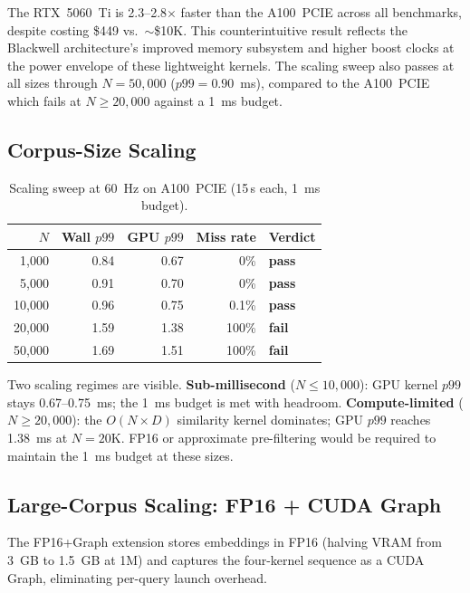 \documentclass[11pt]{article}
\begin{document}
The RTX~5060~Ti is 2.3--2.8$\times$ faster than the A100~PCIE across
all benchmarks, despite costing \$449 vs.\ $\sim$\$10K. This
counterintuitive result reflects the Blackwell architecture's improved
memory subsystem and higher boost clocks at the power envelope of these
lightweight kernels. The scaling sweep also passes at all sizes through
$N{=}50{,}000$ ($p99 = 0.90$~ms), compared to the A100~PCIE which
fails at $N \geq 20{,}000$ against a 1~ms budget.

\subsection{Corpus-Size Scaling}

\begin{table}[ht]
\centering
\small
\caption{Scaling sweep at 60~Hz on A100~PCIE (15\,s each, 1~ms budget).}
\label{tab:scaling}
\begin{tabular}{rrrrl}
\toprule
\textbf{$N$} & \textbf{Wall $p99$} & \textbf{GPU $p99$} & \textbf{Miss rate} & \textbf{Verdict} \\
\midrule
 1{,}000 & 0.84 & 0.67 &    0\% & \textbf{pass} \\
 5{,}000 & 0.91 & 0.70 &    0\% & \textbf{pass} \\
10{,}000 & 0.96 & 0.75 &  0.1\% & \textbf{pass} \\
20{,}000 & 1.59 & 1.38 &  100\% & \textbf{fail} \\
50{,}000 & 1.69 & 1.51 &  100\% & \textbf{fail} \\
\bottomrule
\end{tabular}
\end{table}

Two scaling regimes are visible. \textbf{Sub-millisecond}
($N \leq 10{,}000$): GPU kernel $p99$ stays 0.67--0.75~ms; the 1~ms
budget is met with headroom. \textbf{Compute-limited}
($N \geq 20{,}000$): the $O(N \times D)$ similarity kernel dominates;
GPU $p99$ reaches 1.38~ms at $N{=}20$K. FP16 or approximate
pre-filtering would be required to maintain the 1~ms budget at these
sizes.

\subsection{Large-Corpus Scaling: FP16 + CUDA Graph}
\label{sec:fp16scaling}

The FP16+Graph extension stores embeddings in FP16 (halving VRAM from 3~GB to
1.5~GB at 1M) and captures the four-kernel sequence as a CUDA Graph,
eliminating per-query launch overhead.
\end{document}
